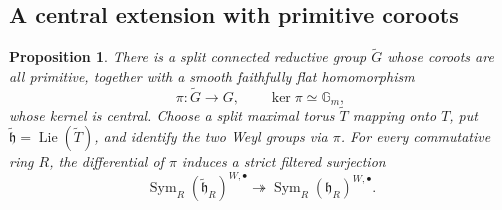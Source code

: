 \documentclass[twoside,a4paper,12pt,reqno]{amsart}
\newtheorem{proposition}[theorem]{Proposition}
\theoremstyle{remark}
\numberwithin{equation}{section}
\newcommand{\Gm}{\mathbb G_m}
\newcommand{\fh}{\mathfrak h}
\DeclareMathOperator{\Sym}{Sym}
\DeclareMathOperator{\Lie}{Lie}
\begin{document}
\subsection{A central extension with primitive coroots}

\begin{proposition}\label{prop:cover}
There is a split connected reductive group \(\widetilde G\) whose coroots
are all primitive, together with a smooth faithfully flat homomorphism
\[
\pi:\widetilde G\longrightarrow G,\qquad \ker\pi\simeq\Gm,
\]
whose kernel is central.
Choose a split maximal torus \(\widetilde T\) mapping onto \(T\), put
\(\widetilde{\fh}=\Lie(\widetilde T)\), and identify the two Weyl groups
via \(\pi\). For every commutative ring \(R\), the differential of \(\pi\)
induces a strict filtered surjection
\[
\Sym_R(\widetilde{\fh}_R)^{W,\bullet}
\twoheadrightarrow \Sym_R(\fh_R)^{W,\bullet}.
\]
\end{proposition}
\end{document}
